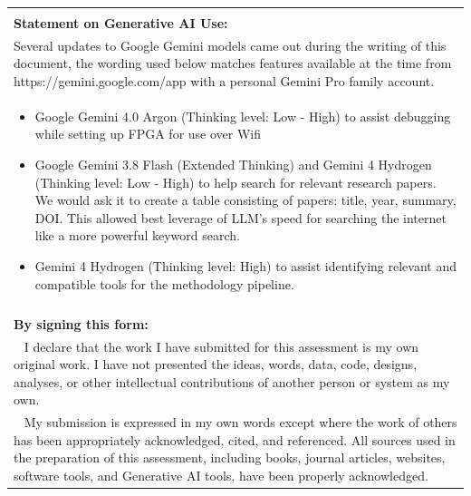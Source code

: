 \begin{longtable}{|>{\raggedright\arraybackslash}p{\textwidth}|}
	\hline
	\endfirsthead
	\hline
	\multicolumn{1}{|r|}{\footnotesize\it (form continued from previous page)} \\
	\endhead
	\multicolumn{1}{|r|}{\footnotesize\it (form continues on next page)} \\
	\hline
	\endfoot
	\hline
	\endlastfoot
	
		\textbf{Statement on Generative AI Use:}
		\\
		Several updates to Google Gemini models came out during the writing of this document, the wording used below matches features available at the time from https://gemini.google.com/app with a personal Gemini Pro family account.
		\\
		\begin{itemize}
			\item Google Gemini 4.0 Argon (Thinking level: Low - High) to assist debugging while setting up FPGA for use over Wifi
			\item Google Gemini 3.8 Flash (Extended Thinking) and Gemini 4 Hydrogen (Thinking level: Low - High) to help search for relevant research papers. We would ask it to create a table consisting of papers: title, year, summary, DOI. This allowed best leverage of LLM's speed for searching the internet like a more powerful keyword search.
			\item Gemini 4 Hydrogen (Thinking level: High) to assist identifying relevant and compatible tools for the methodology pipeline.
		\end{itemize}
		\\
	\hline
	\multicolumn{1}{l}{}
	\\
	\hline
		\textbf{By signing this form:}
		\\
		
		\textbullet~ I declare that the work I have submitted for this assessment is my own original work. I have not presented the ideas, words, data, code, designs, analyses, or other intellectual contributions of another person or system as my own. 
		\\
		
		\textbullet~ My submission is expressed in my own words except where the work of others has been appropriately acknowledged, cited, and referenced. All sources used in the preparation of this assessment, including books, journal articles, websites, software tools, and Generative AI tools, have been properly acknowledged.
		\\
		

\end{longtable}
